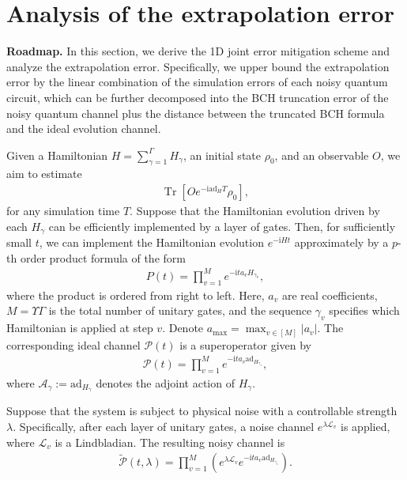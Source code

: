 \documentclass[aps,pra,reprint,groupedaddress,floatfix]{revtex4-2}
\renewcommand{\i}{\mathrm{i}}
\newcommand{\ad}{\mathrm{ad}}
\renewcommand{\P}{\mathcal{P}}
\newcommand{\A}{\mathcal{A}}
\newcommand{\mc}{\mathcal}
\newcommand{\xz}[1]{{\color{cyan} XZ: #1}}
\newcommand{\sz}[1]{{\color{blue} Shuo: #1}}
\begin{document}
\section{Analysis of the extrapolation error}
\textbf{Roadmap.} In this section, we derive the 1D joint error mitigation scheme and analyze the extrapolation error. Specifically, we upper bound the extrapolation error by the linear combination of the simulation errors of each noisy quantum circuit, which can be further decomposed into the BCH truncation error of the noisy quantum channel plus the distance between the truncated BCH formula and the ideal evolution channel.

Given a Hamiltonian $H = \sum_{\gamma=1}^{\Gamma} H_{\gamma}$, an initial state $\rho_0$, and an observable $O$, we aim to estimate \begin{align*}
    \operatorname{Tr}[Oe^{-\i \ad_H T} \rho_0],
\end{align*}
for any simulation time $T$.
Suppose that the Hamiltonian evolution driven by each $H_{\gamma}$ can be efficiently implemented by a layer of gates. Then, for sufficiently small $t$, we can implement the Hamiltonian evolution $e^{-\i H t}$ approximately by a $p$-th order product formula of the form
\begin{align*}
    P(t) = \prod_{v=1}^Me^{-\i t a_{v} H_{\gamma_v}},
\end{align*}
where the product is ordered from right to left. Here, $a_{v}$ are real coefficients, $M = \Upsilon\Gamma$ is the total number of unitary gates, and the sequence $\gamma_v$ specifies which Hamiltonian is applied at step $v$. Denote $a_{\max} = \max_{v\in [M]} |a_v|$. The corresponding ideal channel $\P(t)$ is a superoperator given by
\begin{align*}
    \P(t) = \prod_{v=1}^Me^{-\i t a_{v} \ad_{H_{\gamma_v}}},
\end{align*}
where $\A_{\gamma}:=\ad_{H_{\gamma}}$ denotes the adjoint action of $H_{\gamma}$. 

Suppose that the system is subject to physical noise with a controllable strength $\lambda$. Specifically, after each layer of unitary gates, a noise channel $e^{\lambda \mc L_{v}}$ is applied, where $\mc L_{v}$ is a Lindbladian. The resulting noisy channel is
\begin{align*}
    \tilde{\P}(t,\lambda)=\prod_{v=1}^M\left( e^{\lambda \mc L_{v}} e^{-\i t a_{v} \ad_{H_{\gamma_v}}} \right).
\end{align*} 
\end{document}

